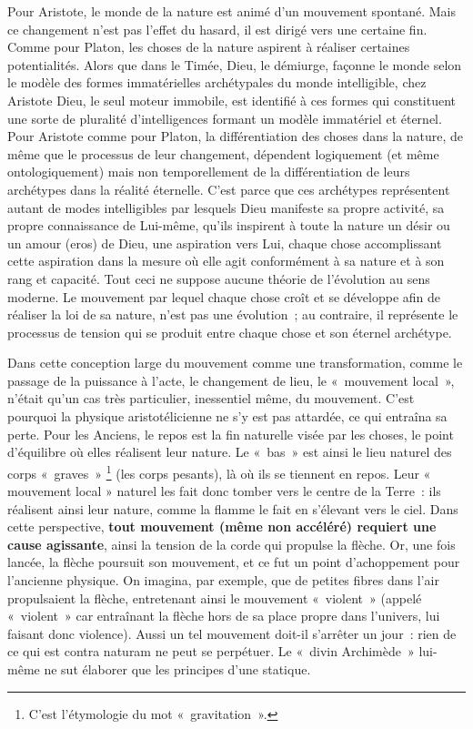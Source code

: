 \documentclass[a4paper,12pt]{article}
\begin{document}
Pour Aristote, le monde de la nature est animé d'un mouvement spontané. Mais ce changement n'est pas l'effet du hasard, il est dirigé vers une certaine fin. Comme pour Platon, les choses de la nature aspirent à réaliser certaines potentialités. Alors que dans le Timée, Dieu, le démiurge, façonne le monde selon le modèle des formes immatérielles archétypales du monde intelligible, chez Aristote Dieu, le seul moteur immobile, est identifié à ces formes qui constituent une sorte de pluralité d'intelligences formant un modèle immatériel et éternel. Pour Aristote comme pour Platon, la différentiation des choses dans la nature, de même que le processus de leur changement, dépendent logiquement (et même ontologiquement) mais non temporellement de la différentiation de leurs archétypes dans la réalité éternelle. C'est parce que ces archétypes représentent autant de modes intelligibles par lesquels Dieu manifeste sa propre activité, sa propre connaissance de Lui-même, qu'ils inspirent à toute la nature un désir ou un amour (eros) de Dieu, une aspiration vers Lui, chaque chose accomplissant cette aspiration dans la mesure où elle agit conformément à sa nature et à son rang et capacité. Tout ceci ne suppose aucune théorie de l'évolution au sens moderne. Le mouvement par lequel chaque chose croît et se développe afin de réaliser la loi de sa nature, n'est pas une évolution ; au contraire, il représente le processus de tension qui se produit entre chaque chose et son éternel archétype. 

Dans cette conception large du mouvement comme une transformation, comme le passage de la puissance à l’acte, le changement de lieu, le « mouvement local », n'était qu'un cas très particulier, inessentiel même, du mouvement. C'est pourquoi la physique aristotélicienne ne s'y est pas attardée, ce qui entraîna sa perte. Pour les Anciens, le repos est la fin naturelle visée par les choses, le point d'équilibre où elles réalisent leur nature. Le « bas » est ainsi le lieu naturel des corps « graves » \footnote{C’est l’étymologie du mot « gravitation ».} (les corps pesants), là où ils se tiennent en repos. Leur « mouvement local » naturel les fait donc tomber vers le centre de la Terre : ils réalisent ainsi leur nature, comme la flamme le fait en s’élevant vers le ciel. Dans cette perspective,  \textbf{tout mouvement (même non accéléré) requiert une cause agissante}, ainsi la tension de la corde qui propulse la flèche. Or, une fois lancée, la flèche poursuit son mouvement, et ce fut un point d'achoppement pour l'ancienne physique. On imagina, par exemple, que de petites fibres dans l'air propulsaient la flèche, entretenant ainsi le mouvement « violent » (appelé « violent » car entraînant la flèche hors de sa place propre dans l'univers, lui faisant donc violence). Aussi un tel mouvement doit-il s'arrêter un jour : rien de ce qui est contra naturam ne peut se perpétuer. Le « divin Archimède » lui-même ne sut élaborer que les principes d’une statique. 
\end{document}
